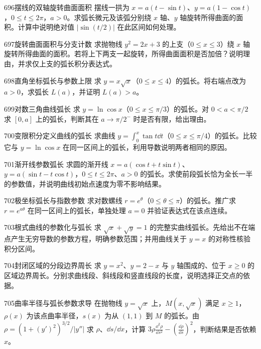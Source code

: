 \begin{exercise}{696}{摆线的双轴旋转曲面面积}
摆线一拱为 $x=a(t-\sin t)$、$y=a(1-\cos t)$，$0\le t\le2\pi$，$a>0$。求弧长微元及该弧分别绕 $x$ 轴、$y$ 轴旋转所得曲面的面积。计算中说明绝对值 $|\sin(t/2)|$ 在此区间如何处理。
\end{exercise}
\begin{exercise}{697}{旋转曲面面积与分支计数}
求抛物线 $y^2=2x+3$ 的上支（$0\le x\le3$）绕 $x$ 轴旋转所得曲面的面积。若将上下两支一起旋转，所得曲面面积是否加倍？说明理由，并求仅上支的弧长积分表达式。
\end{exercise}
\begin{exercise}{698}{直角坐标弧长与参数上限}
求 $y=x\sqrt x$（$0\le x\le4$）的弧长。将右端点改为 $a>0$，求弧长 $L(a)$，并证明 $L(a)>a$。
\end{exercise}
\begin{exercise}{699}{对数三角曲线弧长}
求 $y=\ln\cos x$（$0\le x\le\pi/3$）的弧长。对 $0<a<\pi/2$ 求 $[0,a]$ 上的弧长，判断其在 $a\to\pi/2^-$ 时是否有限，给出理由。
\end{exercise}
\begin{exercise}{700}{变限积分定义曲线的弧长}
求曲线 $y=\int_0^x\tan t\dd t$（$0\le x\le\pi/4$）的弧长。比较它与 $y=\ln\cos x$ 在同一区间上的弧长，利用导数说明两者相同的原因。
\end{exercise}
\begin{exercise}{701}{渐开线参数弧长}
求圆的渐开线 $x=a(\cos t+t\sin t)$、$y=a(\sin t-t\cos t)$，$0\le t\le2\pi$、$a>0$ 的弧长。求使前段弧长恰为全长一半的参数值，并说明曲线初始点速度为零不影响结果。
\end{exercise}
\begin{exercise}{702}{极坐标弧长与指数参数}
求对数螺线 $r=e^\theta$（$0\le\theta\le\pi$）的弧长。推广求 $r=e^{a\theta}$ 在同一区间上的弧长，单独处理 $a=0$ 并验证表达式在该点连续。
\end{exercise}
\begin{exercise}{703}{根式曲线的参数化与弧长}
求 $\sqrt x+\sqrt y=1$ 的完整实曲线弧长。先给出不在端点产生无穷导数的参数方程，明确参数范围；并用曲线关于 $y=x$ 的对称性核验积分区间。
\end{exercise}
\begin{exercise}{704}{封闭区域的分段边界周长}
求 $y=x^2$、$y=2-x$ 与 $y$ 轴围成的、位于 $x\ge0$ 的区域边界周长。分别求曲线段、斜线段和竖直线段的长度，说明选择正交点的依据。
\end{exercise}
\begin{exercise}{705}{曲率半径与弧长参数求导}
在抛物线 $y=\sqrt x$ 上，$M(x,\sqrt x)$ 满足 $x\ge1$，$\rho(x)$ 为该点曲率半径，$s(x)$ 为从 $(1,1)$ 到 $M$ 的弧长。由 $\rho=(1+(y')^2)^{3/2}/|y''|$ 求 $\rho$、$\dd s/\dd x$，计算 $3\rho\frac{\dd^2\rho}{\dd s^2}-(\frac{\dd\rho}{\dd s})^2$，判断结果是否依赖 $x$。
\end{exercise}
